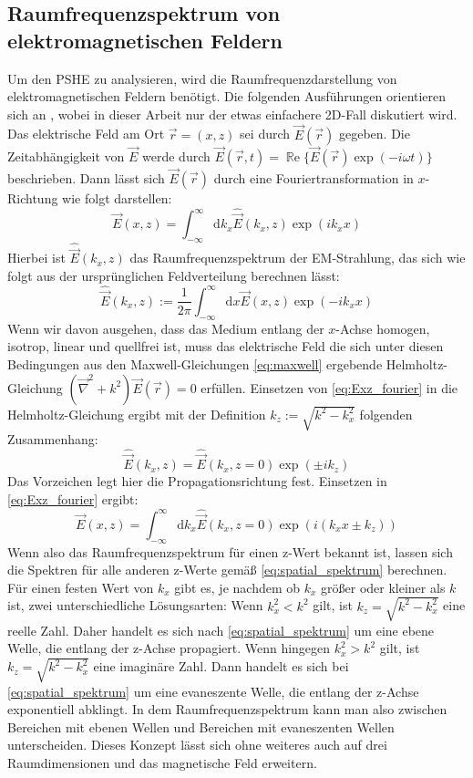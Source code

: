 \documentclass[a4paper, titlepage,  ngerman, fullpage]{book}
\renewcommand{\Re}{\operatorname{\mathbb{R}e}}
\begin{document}
	\subsection{Raumfrequenzspektrum von elektromagnetischen Feldern}
	Um den PSHE zu analysieren, wird die Raumfrequenzdarstellung von elektromagnetischen Feldern benötigt. Die folgenden Ausführungen orientieren sich an \cite{Novotny.2012b}, wobei in dieser Arbeit nur der etwas einfachere 2D-Fall diskutiert wird.\\		
	Das elektrische Feld am Ort $\vec{r} = (x, z) $ sei durch $\vec{E}({\vec{r}})$ gegeben.
	Die Zeitabhängigkeit von $\vec{E}$ werde durch $\vec{E}({\vec{r}, t})=\Re\{\vec{E}({\vec{r}})\exp(-i\omega t)\}$ beschrieben. Dann lässt sich $\vec{E}({\vec{r}})$ durch eine Fouriertransformation in $x$-Richtung wie folgt darstellen:
	\begin{equation}
		\label{eq:Exz_fourier}
		\vec{E}(x,z) = \int_{-\infty}^{\infty}\mathrm{d}{k_x}\hat{\vec{E}}(k_x,z)\exp(ik_xx)				
	\end{equation}
	Hierbei ist $\hat{\vec{E}}(k_x,z)$ das Raumfrequenzspektrum der EM-Strahlung, das sich wie folgt aus der ursprünglichen Feldverteilung berechnen lässt:
	\begin{equation}
		\label{eq:EKxz_fourier}
		\hat{\vec{E}}(k_x,z) := \dfrac{1}{2\pi}\int_{-\infty}^{\infty}\mathrm{d}x\vec{E}(x,z)\exp(-ik_xx)
	\end{equation}
	Wenn wir davon ausgehen, dass das Medium entlang der $x$-Achse homogen, isotrop, linear und quellfrei ist, muss das elektrische Feld die sich unter diesen Bedingungen aus den Maxwell-Gleichungen \eqref{eq:maxwell} ergebende Helmholtz-Gleichung $(\vec{\nabla}^2+k^2)\vec{E}({\vec{r}}) = 0$ erfüllen. Einsetzen von \eqref{eq:Exz_fourier} in die Helmholtz-Gleichung ergibt mit der Definition $k_z := \sqrt{k^2-k_x^2}$ folgenden Zusammenhang:
	\begin{equation}
		\label{eq:spatial_spektrum}
		\hat{\vec{E}}(k_x,z) =\hat{\vec{E}}(k_x,z= 0) \exp(\pm ik_ z)
	\end{equation}
	Das Vorzeichen legt hier die Propagationsrichtung fest.
	Einsetzen in \eqref{eq:Exz_fourier} ergibt:
	\begin{equation}
		\label{eq:Espatial_spektrum}
		\vec{E}(x,z) = \int_{-\infty}^{\infty}\mathrm{d}{k_x}\hat{\vec{E}}(k_x,z= 0)\exp(i(k_xx\pm k_ z))
	\end{equation}
	Wenn also das Raumfrequenzspektrum für einen z-Wert bekannt ist, lassen sich die Spektren für alle anderen z-Werte gemäß \eqref{eq:spatial_spektrum} berechnen. Für einen festen Wert von $k_x$ gibt es, je nachdem ob $k_x$ größer oder kleiner als $k$ ist, zwei unterschiedliche Lösungsarten: Wenn $k_x^2 < k^2$ gilt, ist $k_z = \sqrt{k^2-k_x^2}$ eine reelle Zahl. Daher handelt es sich nach \eqref{eq:spatial_spektrum} um eine ebene Welle, die entlang der z-Achse propagiert.
	Wenn hingegen $k_x^2 > k^2$ gilt, ist $k_z = \sqrt{k^2-k_x^2}$ eine imaginäre Zahl. Dann handelt es sich bei \eqref{eq:spatial_spektrum} um eine evaneszente Welle, die entlang der z-Achse exponentiell abklingt. In dem Raumfrequenzspektrum kann man also zwischen Bereichen mit ebenen Wellen und Bereichen mit evaneszenten Wellen unterscheiden. Dieses Konzept lässt sich ohne weiteres auch auf drei Raumdimensionen und das magnetische Feld erweitern.
\end{document}
